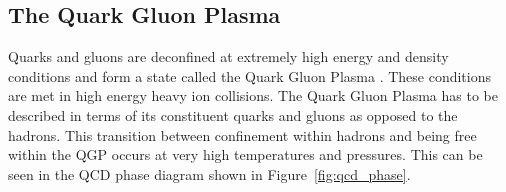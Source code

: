 





\subsection{The Quark Gluon Plasma}
\label{sec:qgp}
Quarks and gluons are deconfined at extremely high energy and density conditions and form a state called the Quark Gluon Plasma \cite{SHURYAK198071}. These conditions are met in high energy heavy ion collisions. 
The Quark Gluon Plasma has to be described in terms of its constituent quarks and gluons as opposed to the hadrons. This transition between confinement within hadrons and being free within the QGP occurs at very high temperatures and pressures. This can be seen in the QCD phase diagram shown in Figure~\ref{fig:qcd_phase}. 

